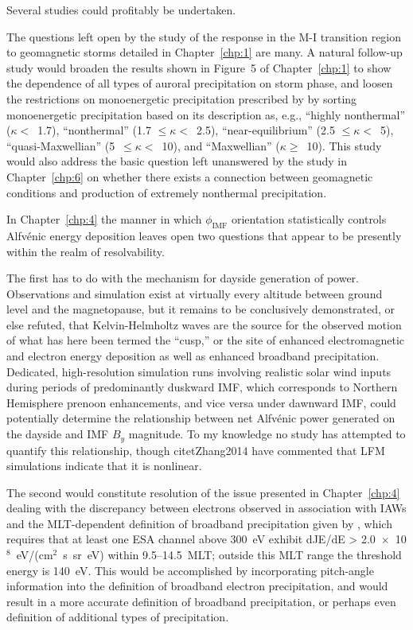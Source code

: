   Several studies could profitably be undertaken. 

  The questions left open by the study of the \Alfic response in the
  M-I transition region to geomagnetic storms detailed in
  Chapter~\ref{chp:1} are many. A natural follow-up study would
  broaden the results shown in Figure~5 of Chapter~\ref{chp:1} to show
  the dependence of all types of auroral precipitation on storm phase,
  and loosen the restrictions on monoenergetic precipitation
  prescribed by \citet{McIntosh2014} by sorting monoenergetic
  precipitation based on its description as, e.g., ``highly
  nonthermal'' ($\kappa <$~1.7), ``nonthermal'' (1.7 $\leq \kappa
  <$~2.5), ``near-equilibrium'' (2.5 $\leq \kappa <$~5),
  ``quasi-Maxwellian'' (5~$\leq \kappa <$~10), and ``Maxwellian''
  ($\kappa \geq$~10). This study would also address the basic question
  left unanswered by the study in Chapter~\ref{chp:6} on whether there
  exists a connection between geomagnetic conditions and production of
  extremely nonthermal precipitation.

  In Chapter~\ref{chp:4} the manner in which $\phi_{\textrm{IMF}}$
  orientation statistically controls Alfv\'{e}nic energy deposition
  leaves open two questions that appear to be presently within the realm
  of resolvability.

  The first has to do with the mechanism for dayside generation of
  \Alfic power. Observations and simulation exist at virtually every
  altitude between ground level and the magnetopause, but it remains
  to be conclusively demonstrated, or else refuted, that
  Kelvin-Helmholtz waves are the source for the observed motion of
  what has here been termed the ``\Alfic cusp,'' or the site of
  enhanced \Alfic electromagnetic and electron energy deposition as
  well as enhanced broadband precipitation. Dedicated, high-resolution
  simulation runs involving realistic solar wind inputs during periods
  of predominantly duskward IMF, which corresponds to Northern
  Hemisphere prenoon \Alfic enhancements, and vice versa under
  dawnward IMF, could potentially determine the relationship between
  net Alfv\'{e}nic power generated on the dayside and IMF $B_y$
  magnitude. To my knowledge no study has attempted to quantify this
  relationship, though citet{Zhang2014} have commented that LFM
  simulations indicate that it is nonlinear.

  The second would constitute resolution of the issue presented in
  Chapter~\ref{chp:4} dealing with the discrepancy between electrons
  observed in association with IAWs and the MLT-dependent definition
  of broadband precipitation given by \citet{Newell2009}, which
  requires that at least one ESA channel above 300~eV exhibit dJE/dE >
  2.0~$\times$~10$^8$~eV/(cm$^2$~s~sr~eV) within 9.5--14.5~MLT;
  outside this MLT range the threshold energy is 140~eV. This would be
  accomplished by incorporating pitch-angle information into the
  definition of broadband electron precipitation, and would result in
  a more accurate definition of broadband precipitation, or perhaps
  even definition of additional types of precipitation.

